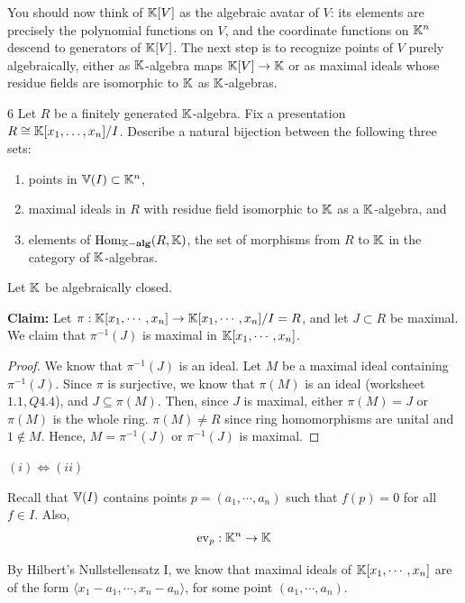 \documentclass[Notebook.tex]{subfiles}
\begin{document}
You should now think of $\mathbb K[V]$ as the algebraic avatar of $V$: its elements are precisely the polynomial functions on $V$, and the coordinate functions on $\mathbb K^n$ descend to generators of $\mathbb K[V]$. The next step is to recognize points of $V$ purely algebraically, either as $\mathbb K$-algebra maps $\mathbb K[V]\to \mathbb K$ or as maximal ideals whose residue fields are isomorphic to $\mathbb K$ as $\mathbb K$-algebras.

\hrulefill

\begin{problem}{6}
    Let $R$ be a finitely generated $\mathbb K$-algebra. Fix a presentation $R \cong \mathbb K[x_1,\ldots,x_n]/I$. Describe a natural bijection between the following three sets:
	\begin{enumerate}[label=(\roman*), ref=\theenumi\roman*]
 	\item points in $\mathbb V(I) \subset \mathbb K^n$, 
	\item maximal ideals in $R$ with residue field isomorphic to $\mathbb K$ as a $\mathbb K$-algebra, and 
	\item elements of $\operatorname{Hom}_{\mathbb K-\operatorname{\textbf{alg}}}(R,\mathbb K)$, the set of morphisms from $R$ to $\mathbb K$ in the category of $\mathbb K$-algebras. 
\end{enumerate}
\end{problem}

\begin{solution}
    \bbni
    
    Let $\mathbb K$ be algebraically closed. 

    \textbf{Claim:} Let $\pi: \mathbb K[x_1, \cdots, x_n] \to \mathbb K[x_1, \cdots, x_n]/I = R$, and let $J \subset R$ be maximal. We claim that $\pi^{-1}(J)$ is maximal in $\mathbb K[x_1, \cdots, x_n]$. 

    \begin{proof}
        We know that $\pi^{-1}(J)$ is an ideal. Let $M$ be a maximal ideal containing $\pi^{-1}(J)$. Since $\pi$ is surjective, we know that $\pi(M)$ is an ideal (worksheet $1.1, Q4.4$), and $J \subseteq \pi(M)$. Then, since $J$ is maximal, either $\pi(M) = J$ or $\pi(M)$ is the whole ring. $\pi(M) \neq R$ since ring homomorphisms are unital and $1 \notin M$. Hence, $M = \pi^{-1}(J)$ or $\pi^{-1}(J)$ is maximal. 
    \end{proof}

    
    $(i) \iff (ii)$

    Recall that $\mathbb V(I)$ contains points $p = (a_1, \cdots, a_n)$ such that $f(p) = 0$ for all $f \in I$. Also, 
    \[\operatorname{ev}_p: \mathbb K^n \to \mathbb K\]

    By Hilbert's Nullstellensatz I, we know that maximal ideals of $\mathbb K[x_1, \cdots, x_n]$ are of the form $\langle x_1 - a_1, \cdots, x_n -a_n \rangle$, for some point $(a_1, \cdots, a_n)$. 
\end{solution}
\end{document}
